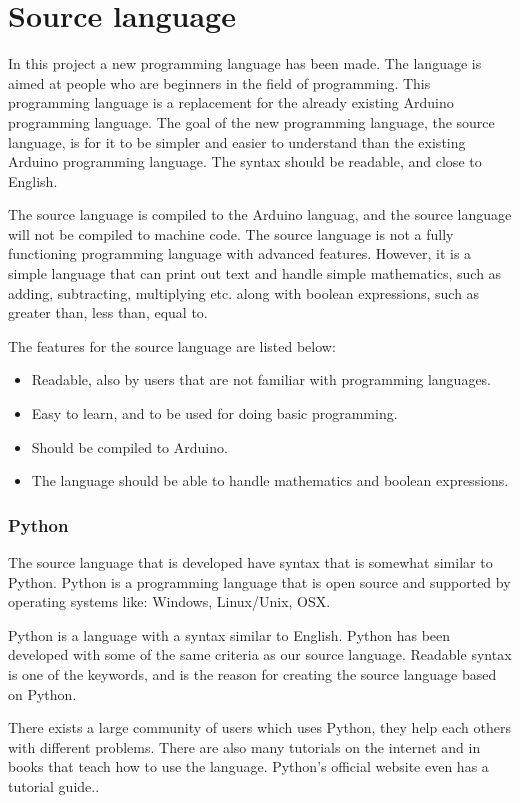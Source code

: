 \chapter{Source language}\label{analysis:source-language}
In this project a new programming language has been made. The language is aimed at people who are beginners in the field of programming. This programming language is a replacement for the already existing Arduino programming language. 
The goal of the new programming language, the source language, is for it to be simpler and easier to understand than the existing Arduino programming language. The syntax should be readable, and close to English.

The source language is compiled to the Arduino languag, and the source language will not be compiled to machine code. The source language is not a fully functioning programming language with advanced features. However, it is a simple language that can print out text and handle simple mathematics, such as adding, subtracting, multiplying etc. along with boolean expressions, such as greater than, less than, equal to.

The features for the source language are listed below:
\begin{itemize}
	\item Readable, also by users that are not familiar with programming languages.
	\item Easy to learn, and to be used for doing basic programming.
	\item Should be compiled to Arduino.
	\item The language should be able to handle mathematics and boolean expressions.
\end{itemize}

\subsection{Python}
The source language that is developed have syntax that is somewhat similar to Python. Python is a programming language that is open source and supported by operating systems like: Windows, Linux/Unix, OSX.

Python is a language with a syntax similar to English.
Python has been developed with some of the same criteria as our source language. Readable syntax is one of the keywords, and is the reason for creating the source language based on Python.
 
\cite{python:official:about}
There exists a large community of users which uses Python, they help each others with different problems. There are also many tutorials on the internet and in books that teach how to use the language. Python's official website even has a tutorial guide.\cite{python:official:tutorial}.
